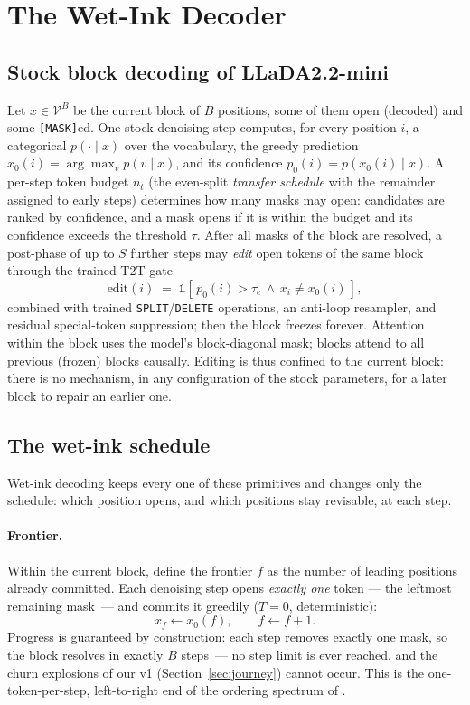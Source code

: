 \section{The Wet-Ink Decoder}\label{sec:method}

\subsection{Stock block decoding of LLaDA2.2-mini}
Let $x \in \mathcal{V}^{B}$ be the current block of $B$ positions, some of them
open (decoded) and some \texttt{[MASK]}ed. One stock denoising step computes, for
every position $i$, a categorical $p(\cdot \mid x)$ over the vocabulary, the greedy
prediction $x_0(i) = \arg\max_v p(v \mid x)$, and its confidence
$p_0(i) = p\!\left(x_0(i) \mid x\right)$. A per-step token budget
$n_t$ (the even-split \emph{transfer schedule} with the remainder assigned to
early steps) determines how many masks may open: candidates are ranked by
confidence, and a mask opens if it is within the budget and its confidence exceeds
the threshold $\tau$. After all masks of the block are resolved, a post-phase of up
to $S$ further steps may \emph{edit} open tokens of the same block through the
trained T2T gate
\begin{equation}\label{eq:t2t}
\mathrm{edit}(i) \;=\; \mathbb{1}\!\left[\, p_0(i) > \tau_e \,\wedge\, x_i \neq x_0(i) \,\right],
\end{equation}
combined with trained \texttt{SPLIT}/\texttt{DELETE} operations, an anti-loop
resampler, and residual special-token suppression; then the block freezes forever.
Attention within the block uses the model's block-diagonal mask; blocks attend to
all previous (frozen) blocks causally. Editing is thus confined to the current
block: there is no mechanism, in any configuration of the stock parameters, for a
later block to repair an earlier one.

\subsection{The wet-ink schedule}
Wet-ink decoding keeps every one of these primitives and changes only the
schedule: which position opens, and which positions stay revisable, at each step.

\paragraph{Frontier.}
Within the current block, define the frontier $f$ as the number of leading
positions already committed. Each denoising step opens \emph{exactly one} token ---
the leftmost remaining mask~--- and commits it greedily
($T{=}0$, deterministic):
\begin{equation}\label{eq:frontier}
x_f \leftarrow x_0(f), \qquad f \leftarrow f + 1 .
\end{equation}
Progress is guaranteed by construction: each step removes exactly one mask, so the
block resolves in exactly $B$ steps~--- no step limit is ever reached, and the
churn explosions of our v1 (Section~\ref{sec:journey}) cannot occur. This is the
one-token-per-step, left-to-right end of the ordering spectrum of
\citet{setdiffusion}.

